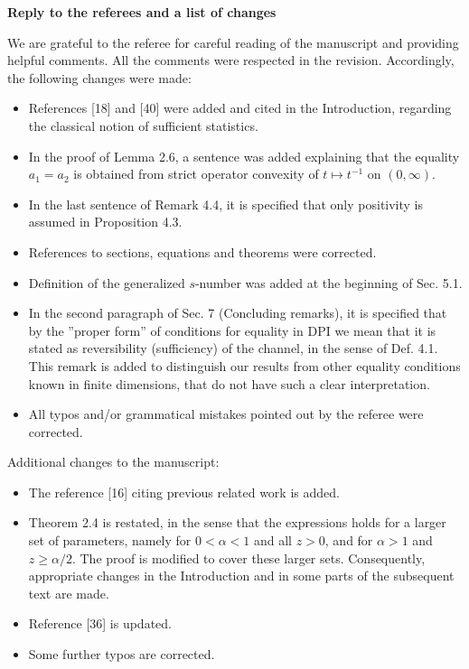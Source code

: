 \documentclass[12pt]{article}
\begin{document}
\begin{center}
\textbf{\large Reply to the referees and a list of changes}
\end{center}

\medskip

We are grateful to the referee for careful reading of the manuscript and providing helpful
comments. All the comments  were respected in the revision. Accordingly, the following changes were made:

\begin{itemize}
\item  References [18] and [40] were added and cited in the Introduction, regarding the
classical notion of sufficient statistics.

\item In the proof of Lemma 2.6, a sentence was added explaining that the equality $a_1=a_2$
is obtained from strict operator convexity of $t\mapsto t^{-1}$ on $(0,\infty)$.

\item In the last sentence of Remark 4.4, it  is  specified that only positivity is
assumed in Proposition 4.3.

\item References to sections, equations and theorems were corrected.

\item Definition of the generalized $s$-number was added at the beginning of Sec. 5.1.


\item In the second paragraph of Sec. 7 (Concluding remarks), it is specified that by the
''proper form'' of conditions for equality in DPI we mean that it is stated as
reversibility (sufficiency) of the channel, in the sense of Def. 4.1. This remark is added
to distinguish our results from other equality conditions known in finite dimensions, that do
not have such a clear interpretation.

\item All typos and/or grammatical mistakes pointed out by the referee were corrected. 






\end{itemize}

Additional changes to the manuscript:

\begin{itemize}
\item The reference [16] citing previous related work is added.

\item Theorem 2.4 is restated, in the sense that the expressions holds for a larger set of
parameters, namely for $0<\alpha<1$ and all $z>0$, and for $\alpha>1$ and $z\ge \alpha/2$. 
The proof is modified to cover these larger sets. Consequently, appropriate changes in the
Introduction and in some parts of the subsequent text are made.

\item Reference [36] is updated.

\item Some further typos are corrected.

\end{itemize}
\end{document}
